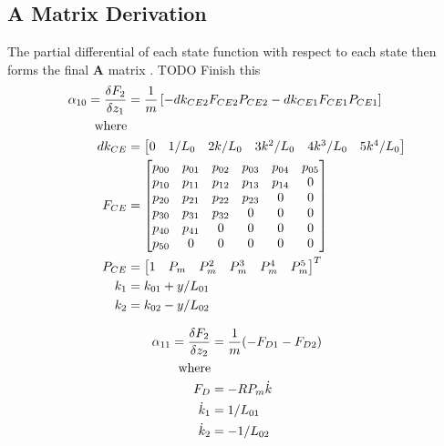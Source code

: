 \documentclass[11pt,a4paper]{article}
\begin{document}
\begin{appendices}
\section{A Matrix Derivation}
\label{sub:Amatderive}
The partial differential of each state function with respect to each state then forms the final $\boldsymbol{A}$ matrix .
TODO Finish this
\begin{align}
    \alpha_{10} = \fdv{F_2}{z_1} &= \frac{1}{m}\left[-dk_{CE2}F_{CE2}P_{CE2}-dk_{CE1}F_{CE1}P_{CE1}\right]
    \label{math:alpha_10_matrix}\\
    \text{where}\nonumber\\
    dk_{CE} &= 
    \begin{bmatrix}
        0 & 1/L_0 & 2k/L_0 & 3k^2/L_0 & 4k^3/L_0 & 5k^4/L_0
    \end{bmatrix}\nonumber\\
    F_{CE} &= 
    \begin{bmatrix}
             p_{00} & p_{01} & p_{02} & p_{03} & p_{04} & p_{05}\\
             p_{10} & p_{11} & p_{12} & p_{13} & p_{14} & 0\\
             p_{20} & p_{21} & p_{22} & p_{23} & 0      & 0\\
             p_{30} & p_{31} & p_{32} & 0      & 0      & 0\\
             p_{40} & p_{41} & 0      & 0      & 0      & 0\\
             p_{50} & 0      & 0      & 0      & 0      & 0
    \end{bmatrix}\nonumber\\
    P_{CE} &= 
    \begin{bmatrix}
        1 & P_m & P_m^2 & P_m^3 & P_m^4 & P_m^5
    \end{bmatrix}^T\nonumber\\
    k_1 &= k_{01} + y/L_{01}\nonumber\\
    k_2 &= k_{02} - y/L_{02}\nonumber
\end{align}

\begin{align}
    \alpha_{11} = \fdv{F_2}{z_2} &= \frac{1}{m}(-F_{D1} - F_{D2})
    \label{math:alpha_11_matrix}\\
    \text{where}\nonumber\\
    F_D &= -RP_{m}\dot{k}\nonumber\\
    \dot{k}_1 &= 1/L_{01}\nonumber\\
    \dot{k}_2 &= -1/L_{02}\nonumber
\end{align}


\end{appendices}
\end{document}
